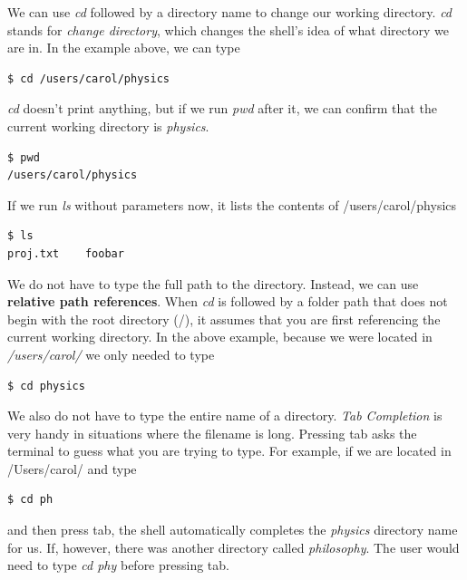 \documentclass{article}
\begin{document}
We can use \emph{cd} followed by a directory name to change our working directory. \emph{cd} stands for \emph{change directory}, which changes the shell's idea of what directory we are in. In the example above, we can type
\begin{lstlisting}
$ cd /users/carol/physics
\end{lstlisting}
\emph{cd} doesn't print anything, but if we run \emph{pwd} after it, we can confirm that the current working directory is \emph{physics}.
\begin{lstlisting}
$ pwd
/users/carol/physics
\end{lstlisting}
If we run \emph{ls} without parameters now, it lists the contents of /users/carol/physics
\begin{lstlisting}
$ ls
proj.txt 	foobar
\end{lstlisting}
We do not have to type the full path to the directory.  Instead, we can use \textbf{relative path references}. When \emph{cd} is followed by a folder path that does not begin with the root directory (/), it assumes that you are first referencing the current working directory. In the above example, because we were located in \emph{/users/carol/} we only needed to type 
\begin{lstlisting}
$ cd physics
\end{lstlisting}
We also do not have to type the entire name of a directory. \emph{Tab Completion} is very handy in situations where the filename is long. Pressing tab asks the terminal to guess what you are trying to type. For example, if we are located in /Users/carol/ and type
\begin{lstlisting}[frame=single]
$ cd ph
\end{lstlisting}
and then press tab, the shell automatically completes the \emph{physics} directory name for us. If, however, there was another directory called \emph{philosophy}. The user would need to type \emph{cd phy} before pressing tab.
\end{document}
